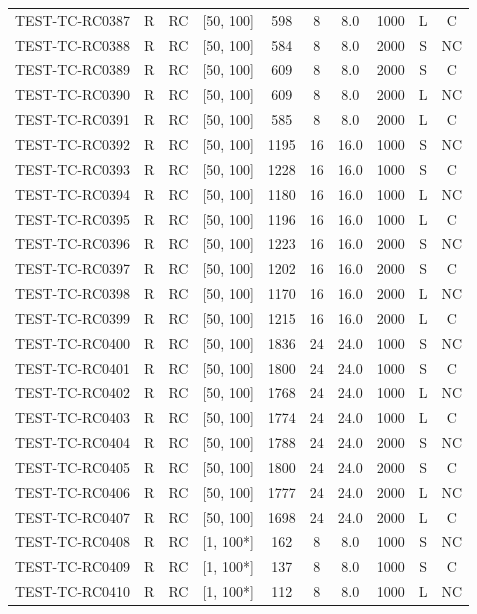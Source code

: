 \begin{longtable}{lccccccccc}
TEST-TC-RC0387 & R & RC & [50, 100] & 598 & 8 & 8.0 & 1000 & L & C \\
TEST-TC-RC0388 & R & RC & [50, 100] & 584 & 8 & 8.0 & 2000 & S & NC \\
TEST-TC-RC0389 & R & RC & [50, 100] & 609 & 8 & 8.0 & 2000 & S & C \\
TEST-TC-RC0390 & R & RC & [50, 100] & 609 & 8 & 8.0 & 2000 & L & NC \\
TEST-TC-RC0391 & R & RC & [50, 100] & 585 & 8 & 8.0 & 2000 & L & C \\
TEST-TC-RC0392 & R & RC & [50, 100] & 1195 & 16 & 16.0 & 1000 & S & NC \\
TEST-TC-RC0393 & R & RC & [50, 100] & 1228 & 16 & 16.0 & 1000 & S & C \\
TEST-TC-RC0394 & R & RC & [50, 100] & 1180 & 16 & 16.0 & 1000 & L & NC \\
TEST-TC-RC0395 & R & RC & [50, 100] & 1196 & 16 & 16.0 & 1000 & L & C \\
TEST-TC-RC0396 & R & RC & [50, 100] & 1223 & 16 & 16.0 & 2000 & S & NC \\
TEST-TC-RC0397 & R & RC & [50, 100] & 1202 & 16 & 16.0 & 2000 & S & C \\
TEST-TC-RC0398 & R & RC & [50, 100] & 1170 & 16 & 16.0 & 2000 & L & NC \\
TEST-TC-RC0399 & R & RC & [50, 100] & 1215 & 16 & 16.0 & 2000 & L & C \\
TEST-TC-RC0400 & R & RC & [50, 100] & 1836 & 24 & 24.0 & 1000 & S & NC \\
TEST-TC-RC0401 & R & RC & [50, 100] & 1800 & 24 & 24.0 & 1000 & S & C \\
TEST-TC-RC0402 & R & RC & [50, 100] & 1768 & 24 & 24.0 & 1000 & L & NC \\
TEST-TC-RC0403 & R & RC & [50, 100] & 1774 & 24 & 24.0 & 1000 & L & C \\
TEST-TC-RC0404 & R & RC & [50, 100] & 1788 & 24 & 24.0 & 2000 & S & NC \\
TEST-TC-RC0405 & R & RC & [50, 100] & 1800 & 24 & 24.0 & 2000 & S & C \\
TEST-TC-RC0406 & R & RC & [50, 100] & 1777 & 24 & 24.0 & 2000 & L & NC \\
TEST-TC-RC0407 & R & RC & [50, 100] & 1698 & 24 & 24.0 & 2000 & L & C \\
TEST-TC-RC0408 & R & RC & [1, 100*] & 162 & 8 & 8.0 & 1000 & S & NC \\
TEST-TC-RC0409 & R & RC & [1, 100*] & 137 & 8 & 8.0 & 1000 & S & C \\
TEST-TC-RC0410 & R & RC & [1, 100*] & 112 & 8 & 8.0 & 1000 & L & NC \\

\end{longtable}

